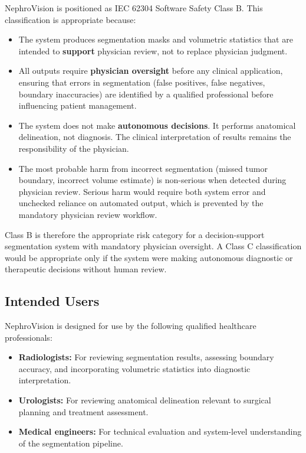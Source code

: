 NephroVision is positioned as IEC 62304 Software Safety Class B. This classification is appropriate because:

\begin{itemize}
    \item The system produces segmentation masks and volumetric statistics that are intended to \textbf{support} physician review, not to replace physician judgment.
    \item All outputs require \textbf{physician oversight} before any clinical application, ensuring that errors in segmentation (false positives, false negatives, boundary inaccuracies) are identified by a qualified professional before influencing patient management.
    \item The system does not make \textbf{autonomous decisions}. It performs anatomical delineation, not diagnosis. The clinical interpretation of results remains the responsibility of the physician.
    \item The most probable harm from incorrect segmentation (missed tumor boundary, incorrect volume estimate) is non-serious when detected during physician review. Serious harm would require both system error and unchecked reliance on automated output, which is prevented by the mandatory physician review workflow.
\end{itemize}

Class B is therefore the appropriate risk category for a decision-support segmentation system with mandatory physician oversight. A Class C classification would be appropriate only if the system were making autonomous diagnostic or therapeutic decisions without human review.

\subsection{Intended Users}

NephroVision is designed for use by the following qualified healthcare professionals:

\begin{itemize}
    \item \textbf{Radiologists:} For reviewing segmentation results, assessing boundary accuracy, and incorporating volumetric statistics into diagnostic interpretation.
    \item \textbf{Urologists:} For reviewing anatomical delineation relevant to surgical planning and treatment assessment.
    \item \textbf{Medical engineers:} For technical evaluation and system-level understanding of the segmentation pipeline.
\end{itemize}

